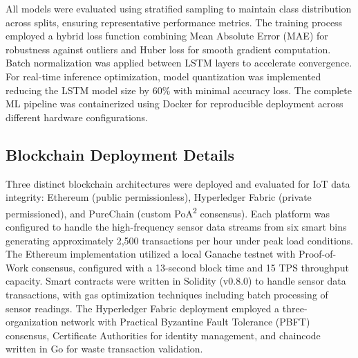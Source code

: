 \documentclass[final,5p,times,twocolumn]{elsarticle}
\begin{document}
All models were evaluated using stratified sampling to maintain class distribution across splits, ensuring representative performance metrics. The training process employed a hybrid loss function combining Mean Absolute Error (MAE) for robustness against outliers and Huber loss for smooth gradient computation. Batch normalization was applied between LSTM layers to accelerate convergence. For real-time inference optimization, model quantization was implemented reducing the LSTM model size by 60\% with minimal accuracy loss. The complete ML pipeline was containerized using Docker for reproducible deployment across different hardware configurations.

\subsection{Blockchain Deployment Details}
Three distinct blockchain architectures were deployed and evaluated for IoT data integrity: Ethereum (public permissionless), Hyperledger Fabric (private permissioned), and PureChain (custom PoA\textsuperscript{2} consensus). Each platform was configured to handle the high-frequency sensor data streams from six smart bins generating approximately 2,500 transactions per hour under peak load conditions. The Ethereum implementation utilized a local Ganache testnet with Proof-of-Work consensus, configured with a 13-second block time and 15 TPS throughput capacity. Smart contracts were written in Solidity (v0.8.0) to handle sensor data transactions, with gas optimization techniques including batch processing of sensor readings. The Hyperledger Fabric deployment employed a three-organization network with Practical Byzantine Fault Tolerance (PBFT) consensus, Certificate Authorities for identity management, and chaincode written in Go for waste transaction validation.
\end{document}
